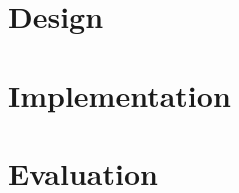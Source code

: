 \chapter{Design}\label{ch:design}
\glsresetall %

\lipsum[9]


\chapter{Implementation}\label{ch:implementation} %
\glsresetall %

\lipsum[4]

\chapter{Evaluation}\label{ch:evaluation} %
\glsresetall %

\lipsum[5]
